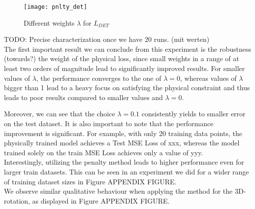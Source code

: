 \begin{figure}[ht]
	\texttt{[image: pnlty\_det]}
	\caption{Different weights $\lambda$ for $L_{DET}$}
	\label{fig:pnlty_det}
\end{figure}

TODO: Precise characterization once we have 20 runs. (mit werten)\\
The first important result we can conclude from this experiment is the robustness (towards?) the weight of the physical loss, since small weights in a range of at least two orders of magnitude lead to significantly improved results. For smaller values of $\lambda$, the performance converges to the one of $\lambda= 0$, whereas values of $\lambda$ bigger than 1 lead to a heavy focus on satisfying the physical constraint and thus leads to poor results compared to smaller values and $\lambda=0$.

Moreover, we can see that the choice $\lambda = 0.1$ consistently yields to smaller error on the test dataset. It is also important to note that the performance improvement is significant. For example, with only 20 training data points, the physically trained model achieves a Test MSE Loss of xxx, whereas the model trained solely on the train MSE Loss achieves only a value of yyy. \\


Interestingly, utilizing the penalty method leads to higher performance even for larger train datasets. This can be seen in an experiment we did for a wider range of training dataset sizes in Figure APPENDIX FIGURE.\\
We observe similar qualitative behaviour when applying the method for the 3D-rotation, as displayed in Figure APPENDIX FIGURE.\\

\clearpage

